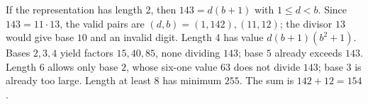 If the representation has length 2, then $143=d(b+1)$ with $1\le d<b$. Since $143=11\cdot 13$, the valid pairs are $(d,b)=(1,142),(11,12)$; the divisor $13$ would give base $10$ and an invalid digit. Length 4 has value $d(b+1)(b^2+1)$. Bases $2,3,4$ yield factors $15,40,85$, none dividing $143$; base $5$ already exceeds $143$. Length $6$ allows only base $2$, whose six-one value $63$ does not divide $143$; base $3$ is already too large. Length at least $8$ has minimum $255$. The sum is $142+12=\boxed{154}$.
